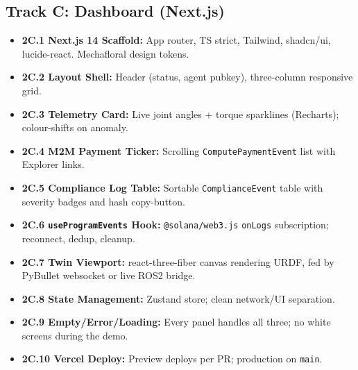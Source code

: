 \documentclass[11pt, a4paper]{article}
\begin{document}
\subsection*{Track C: Dashboard (Next.js)}
\begin{itemize}
    \item \textbf{2C.1 Next.js 14 Scaffold:} App router, TS strict, Tailwind, shadcn/ui, lucide-react. Mechafloral design tokens.
    \item \textbf{2C.2 Layout Shell:} Header (status, agent pubkey), three-column responsive grid.
    \item \textbf{2C.3 Telemetry Card:} Live joint angles + torque sparklines (Recharts); colour-shifts on anomaly.
    \item \textbf{2C.4 M2M Payment Ticker:} Scrolling \texttt{ComputePaymentEvent} list with Explorer links.
    \item \textbf{2C.5 Compliance Log Table:} Sortable \texttt{ComplianceEvent} table with severity badges and hash copy-button.
    \item \textbf{2C.6 \texttt{useProgramEvents} Hook:} \texttt{@solana/web3.js} \texttt{onLogs} subscription; reconnect, dedup, cleanup.
    \item \textbf{2C.7 Twin Viewport:} react-three-fiber canvas rendering URDF, fed by PyBullet websocket or live ROS2 bridge.
    \item \textbf{2C.8 State Management:} Zustand store; clean network/UI separation.
    \item \textbf{2C.9 Empty/Error/Loading:} Every panel handles all three; no white screens during the demo.
    \item \textbf{2C.10 Vercel Deploy:} Preview deploys per PR; production on \texttt{main}.
\end{itemize}
\end{document}
